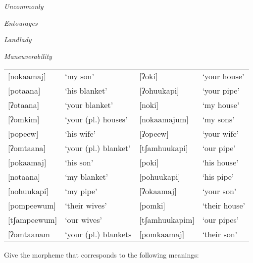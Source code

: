 \documentclass[addpoints]{exam}
\begin{document}
\begin{questions}
        \question[2] \emph{Uncommonly}

        \vspace{3cm}

        \question[2] \emph{Entourages}

        \vspace{3cm}

        \question[2] \emph{Landlady}

        \vspace{3cm}

        \question[2] \emph{Maneuverability}

        \vspace{3cm}



        \begin{tabular}{l l l l}
          {[}nokaamaj]    & `my son'              & [ʔoki]          & `your house' \\
          {[}potaana]     & `his blanket'         & [ʔohuukapi]     & `your pipe' \\
          {[}ʔotaana]     & `your blanket'        & [noki]          & `my house' \\
          {[}ʔomkim]      & `your (pl.) houses'   & [nokaamajum]    & `my sons' \\
          {[}popeew]      & `his wife'            & [ʔopeew]        & `your wife' \\
          {[}ʔomtaana]    & `your (pl.) blanket'  & [tʃamhuukapi]   & `our pipe' \\
          {[}pokaamaj]    & `his son'             & [poki]          & `his house' \\
          {[}notaana]     & `my blanket'          & [pohuukapi]     & `his pipe' \\
          {[}nohuukapi]   & `my pipe'             & [ʔokaamaj]      & `your son' \\
          {[}pompeewum]   & `their wives'         & [pomki]         & `their house' \\
          {[}tʃampeewum]  & `our wives'           & [tʃamhuukapim]  & `our pipes' \\
          {[}ʔomtaanam    & `your (pl.) blankets  & [pomkaamaj]     & `their son'

        \end{tabular}

        \question Give the morpheme that corresponds to the following meanings:
          \begin{parts}
            \parbox[t]{0.45\linewidth}{
}
\end{parts}
\end{questions}
\end{document}
